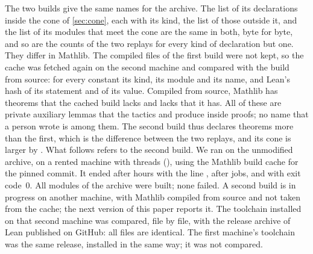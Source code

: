 The two builds give the same names for the archive. The list of its declarations inside the
cone of \cref{sec:cone}, each with its kind, the list of those outside it, and the list of
its modules that meet the cone are the same in both, byte for byte, and so are the counts of
the two replays for every kind of declaration but one. They differ in Mathlib. The compiled
files of the first build were not kept, so the cache was fetched again on the second machine
and compared with the build from source: for every constant its kind, its module and its
name, and Lean's hash of its statement and of its value. Compiled from source, Mathlib has
\mathlibonlysource{} theorems that the cached build lacks and lacks \mathlibonlycache{} that
it has. All of these are private auxiliary lemmas that the tactics  and
 produce inside \mathlibdiffproofs{} proofs; no name that a person wrote is among
them. \mathlibhashnote{} The second build thus declares \mathlibextra{} theorems more than
the first, which is the difference between the two replays, and its cone is larger by
\mathlibextraconewords. \mathlibconeprobenote{} What follows refers to the second build.
\else
We ran  on the unmodified archive, on a rented machine with
\buildthreads{} threads (\buildcpu), using the Mathlib build cache for the pinned commit. It
ended after \buildhours{} hours with the line , after
\buildjobs{} jobs, and with exit code~$0$. All \filecount{} modules of the archive were built;
none failed. A second build is in progress on another machine, with Mathlib compiled from
source and not taken from the cache; the next version of this paper reports it. The toolchain
installed on that second machine was compared, file by file, with the release archive of Lean
\leanversion{} published on GitHub: all \toolchainfiles{} files are identical. The first
machine's toolchain was the same release, installed in the same way; it was not compared.
\fi

